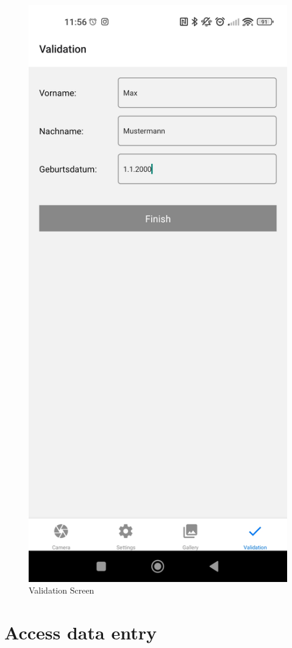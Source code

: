 \begin{figure}
    \centering
    \includegraphics[scale=0.2]{pics/ValidationScreen.jpg}
    \caption{Validation Screen}
    \label{fig:impl:validationscreen}
\end{figure}

\FloatBarrier

\section{Access data entry}


